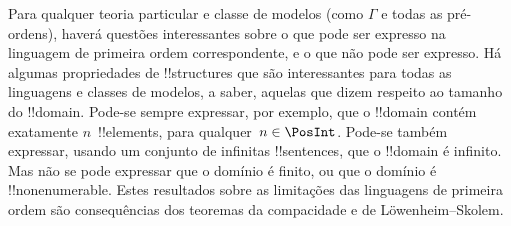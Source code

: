 \documentclass[../../../include/open-logic-section]{subfiles}
\begin{document}
Para qualquer teoria particular e classe de modelos (como $\Gamma$ e
todas as pré-ordens), haverá questões interessantes sobre o que pode ser
expresso na linguagem de primeira ordem correspondente, e o que não pode
ser expresso. Há algumas propriedades de !!{structure}s que são
interessantes para todas as linguagens e classes de modelos, a saber,
aquelas que dizem respeito ao tamanho do !!{domain}.  Pode-se sempre
expressar, por exemplo, que o !!{domain} contém exatamente $n$~!!{element}s,
para qualquer~$n \in \PosInt$.  Pode-se também expressar, usando um
conjunto de infinitas !!{sentence}s, que o !!{domain} é
infinito.  Mas não se pode expressar que o domínio é finito, ou que o
domínio é !!{nonenumerable}. Estes resultados sobre as limitações das
linguagens de primeira ordem são consequências dos teoremas da
compacidade e de L\"owenheim--Skolem.
\end{document}
